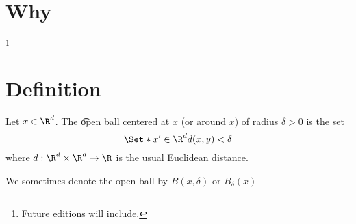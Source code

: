 
\section{Why}\footnote{Future editions will include.}

\section{Definition}

Let $x \in \R^d$.
The \t{open ball} centered at $x$ (or around $x$) of radius $\delta > 0$ is the set
\[
    \Set*{x' \in \R^{d}}{d(x, y) < \delta}
\]
where $d: \R^d \times \R^d \to \R$ is the usual Euclidean distance.


We sometimes denote the open ball by $B(x,\delta)$ or $B_{\delta}(x)$


\blankpage
